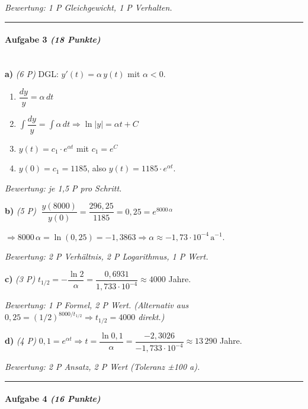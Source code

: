 \documentclass[11pt, a4paper]{article}
\begin{document}
\textit{Bewertung: 1 P Gleichgewicht, 1 P Verhalten.}



\noindent\textcolor{rulegray}{\rule{\linewidth}{0.4pt}}


\paragraph{Aufgabe 3 \textit{(18 Punkte)}}\mbox{}\\[2pt]

\textbf{a)} \textit{(6 P)} DGL: $y'(t) = \alpha\, y(t)$ mit $\alpha < 0$.

\begin{enumerate}
  \item $\dfrac{dy}{y} = \alpha\,dt$
  \item $\int \dfrac{dy}{y} = \int \alpha\,dt \Rightarrow \ln|y| = \alpha t + C$
  \item $y(t) = c_1 \cdot e^{\alpha t}$ mit $c_1 = e^C$
  \item $y(0) = c_1 = 1185$, also $y(t) = 1185 \cdot e^{\alpha t}$.
\end{enumerate}

\textit{Bewertung: je 1,5 P pro Schritt.}


\textbf{b)} \textit{(5 P)} $\;\dfrac{y(8000)}{y(0)} = \dfrac{296{,}25}{1185} = 0{,}25 = e^{8000\,\alpha}$

$\Rightarrow 8000\,\alpha = \ln(0{,}25) = -1{,}3863 \Rightarrow \alpha \approx -1{,}73 \cdot 10^{-4}\,\text{a}^{-1}$.

\textit{Bewertung: 2 P Verhältnis, 2 P Logarithmus, 1 P Wert.}


\textbf{c)} \textit{(3 P)} $t_{1/2} = -\dfrac{\ln 2}{\alpha} = \dfrac{0{,}6931}{1{,}733\cdot 10^{-4}} \approx 4000$ Jahre.

\textit{Bewertung: 1 P Formel, 2 P Wert. (Alternativ aus $0{,}25 = (1/2)^{8000/t_{1/2}} \Rightarrow t_{1/2}=4000$ direkt.)}


\textbf{d)} \textit{(4 P)} $0{,}1 = e^{\alpha t} \Rightarrow t = \dfrac{\ln 0{,}1}{\alpha} = \dfrac{-2{,}3026}{-1{,}733 \cdot 10^{-4}} \approx 13\,290$ Jahre.

\textit{Bewertung: 2 P Ansatz, 2 P Wert (Toleranz ±100 a).}



\noindent\textcolor{rulegray}{\rule{\linewidth}{0.4pt}}


\paragraph{Aufgabe 4 \textit{(16 Punkte)}}\mbox{}\\[2pt]
\end{document}
